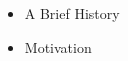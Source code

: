 \documentclass[11pt,twoside]{article}
\numberwithin{equation}{section}
\newcommand{\?}{\stackrel{?}{=}}
\begin{document}
\begin{itemize}
\item A Brief History 


\item Motivation


\end{itemize}







\end{document}
